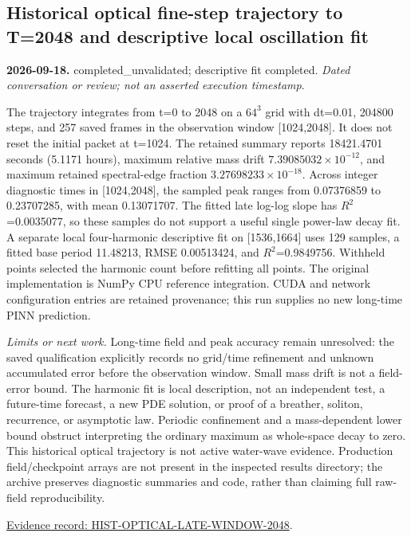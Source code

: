 \documentclass[11pt]{article}
\begin{document}
\subsection*{Historical optical fine-step trajectory to T=2048 and descriptive local oscillation fit}
\noindent\textbf{2026-09-18.} completed\_unvalidated; descriptive fit completed. \emph{Dated conversation or review; not an asserted execution timestamp}.\par
The trajectory integrates from t=0 to 2048 on a $64^3$ grid with dt=0.01, 204800 steps, and 257 saved frames in the observation window [1024,2048]. It does not reset the initial packet at t=1024. The retained summary reports 18421.4701 seconds (5.1171 hours), maximum relative mass drift $7.39085032\times 10^{-12}$, and maximum retained spectral-edge fraction $3.27698233\times 10^{-18}$. Across integer diagnostic times in [1024,2048], the sampled peak ranges from 0.07376859 to 0.23707285, with mean 0.13071707. The fitted late log-log slope has $R^2$=0.0035077, so these samples do not support a useful single power-law decay fit. A separate local four-harmonic descriptive fit on [1536,1664] uses 129 samples, a fitted base period 11.48213, RMSE 0.00513424, and $R^2$=0.9849756. Withheld points selected the harmonic count before refitting all points. The original implementation is NumPy CPU reference integration. CUDA and network configuration entries are retained provenance; this run supplies no new long-time PINN prediction.

\noindent\textit{Limits or next work.} Long-time field and peak accuracy remain unresolved: the saved qualification explicitly records no grid/time refinement and unknown accumulated error before the observation window. Small mass drift is not a field-error bound. The harmonic fit is local description, not an independent test, a future-time forecast, a new PDE solution, or proof of a breather, soliton, recurrence, or asymptotic law. Periodic confinement and a mass-dependent lower bound obstruct interpreting the ordinary maximum as whole-space decay to zero. This historical optical trajectory is not active water-wave evidence. Production field/checkpoint arrays are not present in the inspected results directory; the archive preserves diagnostic summaries and code, rather than claiming full raw-field reproducibility.

\noindent\href{https://github.com/matasvai/dysthe-paper/blob/codex/research-record-2026-11-05/research-record/2026-11-05/README.md#hist-optical-late-window-2048}{Evidence record: HIST-OPTICAL-LATE-WINDOW-2048}.
\end{document}
